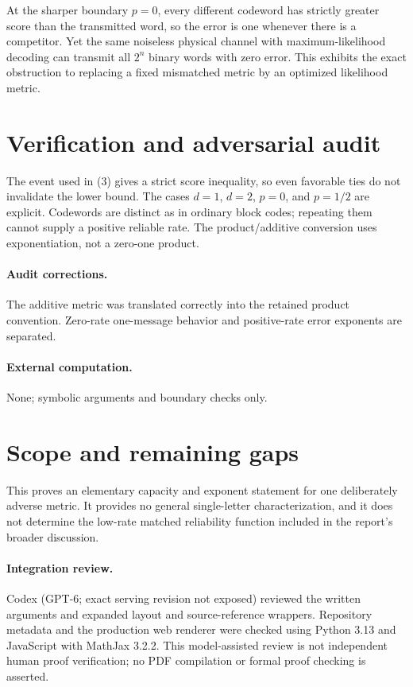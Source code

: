 \documentclass[11pt]{article}
\begin{document}
At the sharper boundary $p=0$, every different codeword has strictly greater score than the transmitted word, so the error is one whenever there is a competitor. Yet the same noiseless physical channel with maximum-likelihood decoding can transmit all $2^n$ binary words with zero error. This exhibits the exact obstruction to replacing a fixed mismatched metric by an optimized likelihood metric.
\section{Verification and adversarial audit}
The event used in (3) gives a strict score inequality, so even favorable ties do not invalidate the lower bound. The cases $d=1$, $d=2$, $p=0$, and $p=1/2$ are explicit. Codewords are distinct as in ordinary block codes; repeating them cannot supply a positive reliable rate. The product/additive conversion uses exponentiation, not a zero-one product.
\paragraph{Audit corrections.} The additive metric was translated correctly into the retained product convention. Zero-rate one-message behavior and positive-rate error exponents are separated.
\paragraph{External computation.} None; symbolic arguments and boundary checks only.
\section{Scope and remaining gaps}
This proves an elementary capacity and exponent statement for one deliberately adverse metric. It provides no general single-letter characterization, and it does not determine the low-rate matched reliability function included in the report's broader discussion.
\paragraph{Integration review.} Codex (GPT-6; exact serving revision not exposed) reviewed the written arguments and expanded layout and source-reference wrappers. Repository metadata and the production web renderer were checked using Python 3.13 and JavaScript with MathJax 3.2.2. This model-assisted review is not independent human proof verification; no PDF compilation or formal proof checking is asserted.
\end{document}
